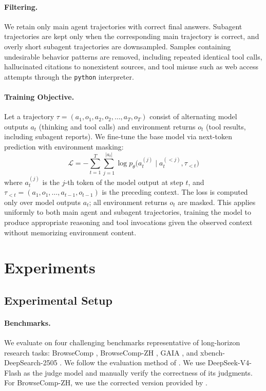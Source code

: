 \documentclass{llmxive}
\begin{document}
\paragraph{Filtering.}
We retain only main agent trajectories with correct final answers. Subagent trajectories are kept only when the corresponding main trajectory is correct, and overly short subagent trajectories are downsampled. Samples containing undesirable behavior patterns are removed, including repeated identical tool calls, hallucinated citations to nonexistent sources, and tool misuse such as web access attempts through the \texttt{python} interpreter.

\paragraph{Training Objective.}
Let a trajectory $\tau = (a_1, o_1, a_2, o_2, \ldots, a_T, o_T)$ consist of alternating model outputs $a_t$ (thinking and tool calls) and environment returns $o_t$ (tool results, including subagent reports). We fine-tune the base model via next-token prediction with environment masking:
\begin{equation}
\mathcal{L} = -\sum_{t=1}^{T} \sum_{j=1}^{|a_t|} \log p_\theta\bigl(a_t^{(j)} \mid a_t^{(<j)}, \tau_{<t}\bigr)
\end{equation}
where $a_t^{(j)}$ is the $j$-th token of the model output at step $t$, and $\tau_{<t} = (a_1, o_1, \ldots, a_{t-1}, o_{t-1})$ is the preceding context. The loss is computed only over model outputs $a_t$; all environment returns $o_t$ are masked. This applies uniformly to both main agent and subagent trajectories, training the model to produce appropriate reasoning and tool invocations given the observed context without memorizing environment content.
\section{Experiments}
\label{sec:experiments}

\subsection{Experimental Setup}

\paragraph{Benchmarks.}
We evaluate on four challenging benchmarks representative of long-horizon research tasks: BrowseComp \citep{wei2025browsecomp}, BrowseComp-ZH \citep{zhou2025browsecomp}, GAIA \citep{mialon2024gaia}, and xbench-DeepSearch-2505 \citep{xbench2025}. We follow the evaluation method of \citet{team2026mirothinker}. We use DeepSeek-V4-Flash as the judge model and manually verify the correctness of its judgments. For BrowseComp-ZH, we use the corrected version provided by \citet{team2026longcat}.
\end{document}
